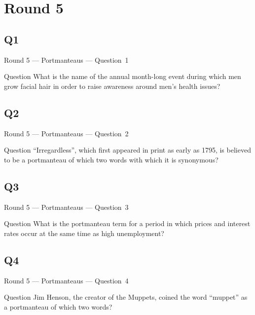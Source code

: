 \documentclass[11pt]{beamer}
\begin{document}
\section{Round 5}
\subsection*{Q1}
\begin{frame}[t]{Round 5 --- Portmanteaus --- \mbox{Question 1}}
\vspace{-0.5em}
\begin{block}{Question}
What is the name of the annual month-long event during which men grow facial hair in order to raise awareness around men's health issues?
\end{block}
\end{frame}
\subsection*{Q2}
\begin{frame}[t]{Round 5 --- Portmanteaus --- \mbox{Question 2}}
\vspace{-0.5em}
\begin{block}{Question}
``Irregardless'', which first appeared in print as early as 1795, is believed to be a portmanteau of which two words with which it is synonymous?
\end{block}
\end{frame}
\subsection*{Q3}
\begin{frame}[t]{Round 5 --- Portmanteaus --- \mbox{Question 3}}
\vspace{-0.5em}
\begin{block}{Question}
What is the portmanteau term for a period in which prices and interest rates occur at the same time as high unemployment?
\end{block}
\end{frame}
\subsection*{Q4}
\begin{frame}[t]{Round 5 --- Portmanteaus --- \mbox{Question 4}}
\vspace{-0.5em}
\begin{block}{Question}
Jim Henson, the creator of the Muppets, coined the word ``muppet'' as a portmanteau of which two words?
\end{block}
\end{frame}
\end{document}
